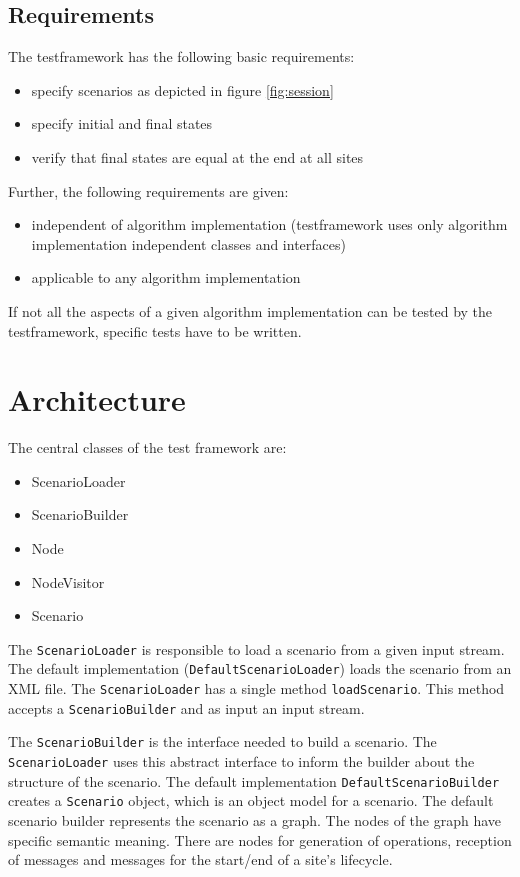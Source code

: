\documentclass[11pt,a4paper]{article}
\begin{document}
\subsection{Requirements}
The testframework has the following basic requirements:
\begin{itemize}
 \item specify scenarios as depicted in figure \ref{fig:session}
 \item specify initial and final states
 \item verify that final states are equal at the end at all sites
\end{itemize}
Further, the following requirements are given:
\begin{itemize}
 \item independent of algorithm implementation (testframework uses only 
       algorithm implementation independent classes and interfaces)
 \item applicable to any algorithm implementation
\end{itemize}
If not all the aspects of a given algorithm implementation can be tested by the testframework, specific tests have to be written.



\section{Architecture}
The central classes of the test framework are:

\begin{itemize}
 \item ScenarioLoader
 \item ScenarioBuilder
 \item Node
 \item NodeVisitor
 \item Scenario
\end{itemize}

The \texttt{ScenarioLoader} is responsible to load a scenario from a given input stream. The default implementation (\texttt{DefaultScenarioLoader}) loads the scenario from an XML file. The \texttt{ScenarioLoader} has a single method \texttt{loadScenario}. This method accepts a \texttt{ScenarioBuilder} and as input an input stream.

The \texttt{ScenarioBuilder} is the interface needed to build a scenario. The \texttt{ScenarioLoader} uses this abstract interface to inform the builder about the structure of the scenario. The default implementation \texttt{DefaultScenarioBuilder} creates a \texttt{Scenario} object, which is an object model for a scenario. The default scenario builder represents the scenario as a graph. The nodes of the graph have specific semantic meaning. There are nodes for generation of operations, reception of messages and messages for the start/end of a site's lifecycle.
\end{document}
